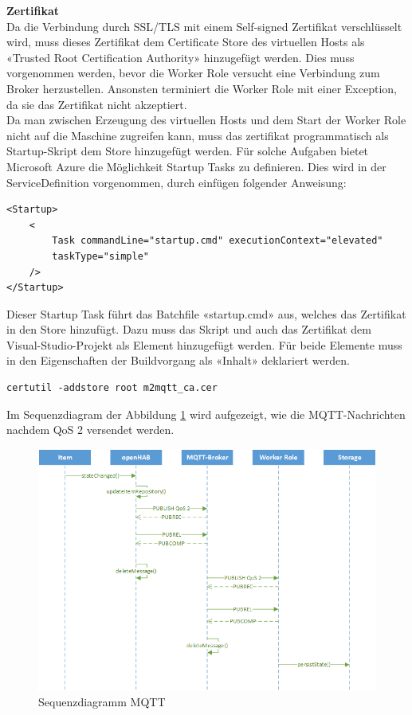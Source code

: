 \textbf{Zertifikat} \\
Da die Verbindung durch SSL/TLS mit einem Self-signed Zertifikat verschlüsselt wird, muss dieses Zertifikat dem Certificate Store des virtuellen Hosts als «Trusted Root Certification Authority» hinzugefügt werden. Dies muss vorgenommen werden, bevor die Worker Role versucht eine Verbindung zum Broker herzustellen. Ansonsten terminiert die Worker Role mit einer Exception, da sie das Zertifikat nicht akzeptiert. \\
Da man zwischen Erzeugung des virtuellen Hosts und dem Start der Worker Role nicht auf die Maschine zugreifen kann, muss das zertifikat programmatisch als Startup-Skript dem Store hinzugefügt werden. Für solche Aufgaben bietet Microsoft Azure die Möglichkeit Startup Tasks zu definieren. Dies wird in der ServiceDefinition vorgenommen, durch einfügen folgender Anweisung:
\begin{lstlisting}[style=csharp, caption=ServiceDefinition.csdef - Startup Task]
<Startup>
	<
		Task commandLine="startup.cmd" executionContext="elevated"
		taskType="simple"
	/>
</Startup>
\end{lstlisting}
Dieser Startup Task führt das Batchfile «startup.cmd» aus, welches das Zertifikat in den Store hinzufügt. Dazu muss das Skript und auch das Zertifikat dem Visual-Studio-Projekt als Element hinzugefügt werden. Für beide Elemente muss in den Eigenschaften der Buildvorgang als «Inhalt» deklariert werden.

\begin{lstlisting}[style=csharp, caption=startup.cmd - Zertifikat hinzufügen]
certutil -addstore root m2mqtt_ca.cer
\end{lstlisting}

Im Sequenzdiagram der Abbildung \ref{fig:sequenzMQTT} wird aufgezeigt, wie die MQTT-Nachrichten nachdem QoS 2 versendet werden.

\begin{figure}[H]
	\centering
		\includegraphics[scale=0.8]{report/img/sequenzDiagramMqtt}
	\caption{Sequenzdiagramm MQTT}
	\label{fig:sequenzMQTT}
\end{figure}

